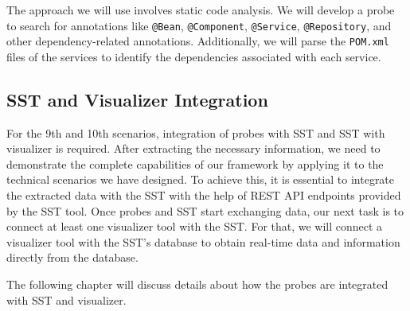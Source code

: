 The approach we will use involves static code analysis. We will develop a probe to search for annotations like \texttt{@Bean}, \texttt{@Component}, \texttt{@Service}, \texttt{@Repository}, and other dependency-related annotations. Additionally, we will parse the \texttt{POM.xml} files of the services to identify the dependencies associated with each service.

\subsection{SST and Visualizer Integration}

For the 9th and 10th scenarios, integration of probes with SST and SST with visualizer is required. After extracting the necessary information, we need to demonstrate the complete capabilities of our framework by applying it to the technical scenarios we have designed. To achieve this, it is essential to integrate the extracted data with the SST with the help of REST API endpoints provided by the SST tool. Once probes and SST start exchanging data, our next task is to connect at least one visualizer tool with the SST. For that, we will connect a visualizer tool with the SST's database to obtain real-time data and information directly from the database.

The following chapter will discuss details about how the probes are integrated with SST and visualizer.
